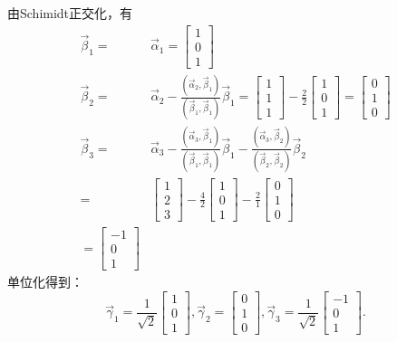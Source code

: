 由Schimidt正交化，有\\
\begin{align*}
\vec{\beta}_1=&\vec{\alpha}_1=\begin{bmatrix}1\\0\\1\end{bmatrix}\\
\vec{\beta}_2=&\vec{\alpha}_2-\frac{(\vec{\alpha}_2,\vec{\beta}_1)}{(\vec{\beta}_1,\vec{\beta}_1)}\vec{\beta}_1
             =\begin{bmatrix}1\\1\\1\end{bmatrix}-\frac{2}{2}\begin{bmatrix}1\\0\\1\end{bmatrix}
             =\begin{bmatrix}0\\1\\0\end{bmatrix}\\
\vec{\beta}_3=&\vec{\alpha}_3-\frac{(\vec{\alpha}_3,\vec{\beta}_1)}{(\vec{\beta}_1,\vec{\beta}_1)}\vec{\beta}_1-
              \frac{(\vec{\alpha}_3,\vec{\beta}_2)}{(\vec{\beta}_2,\vec{\beta}_2)}\vec{\beta}_2\\
             =&\begin{bmatrix}1\\2\\3\end{bmatrix}-\frac{4}{2}\begin{bmatrix}1\\0\\1\end{bmatrix}-
               \frac{2}{1}\begin{bmatrix}0\\1\\0\end{bmatrix}\\
             =\begin{bmatrix}-1\\0\\1\end{bmatrix}
\end{align*}
单位化得到：
\begin{equation*}
\vec{\gamma}_1=\frac{1}{\sqrt{2}}\begin{bmatrix}1\\0\\1\end{bmatrix},
\vec{\gamma}_2=\begin{bmatrix}0\\1\\0\end{bmatrix},
\vec{\gamma}_3=\frac{1}{\sqrt{2}}\begin{bmatrix}-1\\0\\1\end{bmatrix}.
\end{equation*}

